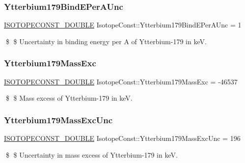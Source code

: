 \subsubsection{\texorpdfstring{Ytterbium179\+Bind\+E\+Per\+A\+Unc}{Ytterbium179BindEPerAUnc}}
{\footnotesize\ttfamily \mbox{\hyperlink{group___isotope_const-_macros_ga8f45a7272ce02c0b4c65c44636ed719a}{I\+S\+O\+T\+O\+P\+E\+C\+O\+N\+S\+T\+\_\+\+D\+O\+U\+B\+LE}} Isotope\+Const\+::\+Ytterbium179\+Bind\+E\+Per\+A\+Unc = 1}

\$ \$ Uncertainty in binding energy per A of Ytterbium-\/179 in keV. \mbox{\label{group___isotope_const-_ytterbium-_yb179_ga356d2b53ba830e7f7bba97dd556b453b}} 
\subsubsection{\texorpdfstring{Ytterbium179\+Mass\+Exc}{Ytterbium179MassExc}}
{\footnotesize\ttfamily \mbox{\hyperlink{group___isotope_const-_macros_ga8f45a7272ce02c0b4c65c44636ed719a}{I\+S\+O\+T\+O\+P\+E\+C\+O\+N\+S\+T\+\_\+\+D\+O\+U\+B\+LE}} Isotope\+Const\+::\+Ytterbium179\+Mass\+Exc = -\/46537}

\$ \$ Mass excess of Ytterbium-\/179 in keV. \mbox{\label{group___isotope_const-_ytterbium-_yb179_ga9ea467ef73302341b2aa9a20903fbf5a}} 
\subsubsection{\texorpdfstring{Ytterbium179\+Mass\+Exc\+Unc}{Ytterbium179MassExcUnc}}
{\footnotesize\ttfamily \mbox{\hyperlink{group___isotope_const-_macros_ga8f45a7272ce02c0b4c65c44636ed719a}{I\+S\+O\+T\+O\+P\+E\+C\+O\+N\+S\+T\+\_\+\+D\+O\+U\+B\+LE}} Isotope\+Const\+::\+Ytterbium179\+Mass\+Exc\+Unc = 196}

\$ \$ Uncertainty in mass excess of Ytterbium-\/179 in keV. \mbox{\label{group___isotope_const-_ytterbium-_yb179_gad0d27b5834849b96f2a444cea7ecf66a}} 
